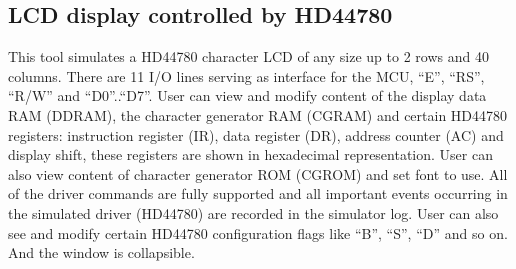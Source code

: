 \documentclass[a4paper,twoside,12pt]{book}
\begin{document}
		\subsection{LCD display controlled by HD44780}
			This tool simulates a HD44780 character LCD of any size up to 2 rows and 40 columns. There are 11 I/O lines serving as interface for the MCU, ``E'', ``RS'', ``R/W'' and ``D0''..``D7''. User can view and modify content of the display data RAM (DDRAM), the character generator RAM (CGRAM) and certain HD44780 registers: instruction register (IR), data register (DR), address counter (AC) and display shift, these registers are shown in hexadecimal representation.
			User can also view content of character generator ROM (CGROM) and set font to use. All of the driver commands are fully supported and all important events occurring in the simulated driver (HD44780) are recorded in the simulator log. User can also see and modify certain HD44780 configuration flags like ``B'', ``S'', ``D'' and so on. And the window is collapsible.
\end{document}
